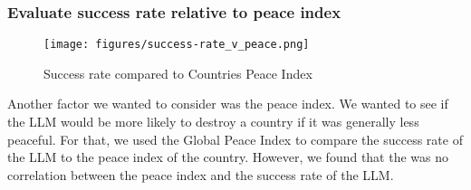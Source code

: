 \subsubsection{Evaluate success rate relative to peace index}

\begin{figure}[H]
    \texttt{[image: figures/success-rate\_v\_peace.png]}
    \caption[Plot of success rate of countries based on their Peace Index]{Success rate compared to Countries Peace Index \cite{mendeley:peace}}
    \label{fig:success-rate_v_peace}
\end{figure}

Another factor we wanted to consider was the peace index. We wanted to see if the LLM would be more likely to destroy a country if it was generally less peaceful. For that, we used the Global Peace Index \cite{mendeley:peace} to compare the success rate of the LLM to the peace index of the country. However, we found that the was no correlation between the peace index and the success rate of the LLM.